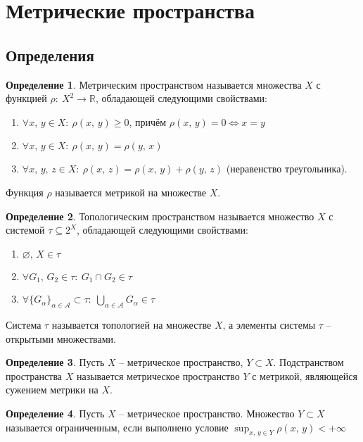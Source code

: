 \documentclass[a4paper,12pt]{article}
\renewcommand{\geq}{\ensuremath{\geqslant}}
\renewcommand{\emptyset}{\ensuremath{\varnothing}}
\theoremstyle{plain}
\theoremstyle{definition}
\newtheorem{definition}{Определение}[section]
\theoremstyle{remark}
\begin{document}
\tableofcontents
\newpage

\section{Метрические пространства}

\subsection{Определения}
\begin{definition}
  Метрическим пространством называется множества $X$ с функцией $\rho :\: X^2 \to \mathbb{R}$, обладающей следующими свойствами:
  \begin{enumerate}
    \item $\forall x,\, y \in X :\: \rho(x,\,y) \geq 0$, причём $\rho(x,\,y) = 0 \Leftrightarrow x = y$
    \item $\forall x,\, y \in X :\: \rho(x,\,y) = \rho(y,\,x)$
    \item $\forall x,\,y,\,z \in X :\: \rho(x,\, z) = \rho(x,\,y) + \rho(y,\,z)$ (неравенство треугольника).
  \end{enumerate}
  Функция $\rho$ называется метрикой на множестве $X$.
\end{definition}

\begin{definition}
  Топологическим пространством называется множество $X$ с системой $\tau \subseteq 2^X$, обладающей следующими свойствами:
  \begin{enumerate}
    \item $\emptyset,\, X \in \tau$
    \item $\forall G_1,\, G_2 \in \tau :\: G_1 \cap G_2 \in \tau$
    \item $\forall \{G_\alpha\}_{\alpha \in \mathcal{A}} \subset \tau :\: \bigcup_{\alpha \in \mathcal{A}} G_\alpha \in \tau$
  \end{enumerate}
  Система $\tau$ называется топологией на множестве $X$, а элементы системы $\tau$ -- открытыми множествами.
\end{definition}

\begin{definition}
  Пусть $X$ -- метрическое пространство, $Y \subset X$. Подстранством пространства $X$ называется метрическое пространство $Y$ с метрикой, являющейся сужением метрики на $X$.
\end{definition}

\begin{definition}
  Пусть $X$ -- метрическое пространство. Множество $Y \subset X$ называется ограниченным, если выполнено условие $\sup_{x,\, y \in Y}\rho(x,\,y) < +\infty$
\end{definition}
\end{document}
